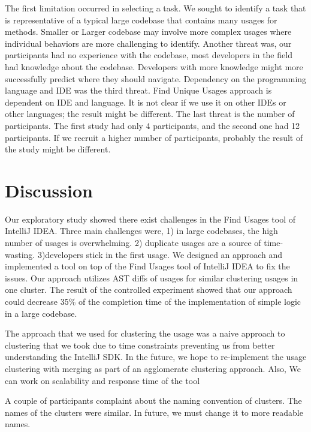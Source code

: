 \documentclass[conference]{IEEEtran}
\begin{document}
The first limitation occurred in selecting a task. We sought to identify a task that is representative of a typical large codebase that contains many usages for methods. Smaller or Larger codebase may involve more complex usages where individual behaviors are more challenging to identify. Another threat was, our participants had no experience with the codebase, most developers in the field had knowledge about the codebase. Developers with more knowledge might more successfully predict where they should navigate. Dependency on the programming language and IDE was the third threat. Find Unique Usages approach is dependent on IDE and language. It is not clear if we use it on other IDEs or other languages; the result might be different. The last threat is the number of participants. The first study had only 4 participants, and the second one had 12 participants. If we recruit a higher number of participants, probably the result of the study might be different.

\section{Discussion}
Our exploratory study showed there exist challenges in the Find Usages tool of IntelliJ IDEA. Three main challenges were, 1) in large codebases, the high number of usages is overwhelming. 2) duplicate usages are a source of time-wasting. 3)developers stick in the first usage. We designed an approach and implemented a tool on top of the Find Usages tool of IntelliJ IDEA to fix the issues. Our approach utilizes AST diffs of usages for similar clustering usages in one cluster. The result of the controlled experiment showed that our approach could decrease 35\% of the completion time of the implementation of simple logic in a large codebase.

The approach that we used for clustering the usage was a naive approach to clustering that we took due to time constraints preventing us from better understanding the IntelliJ SDK. In the future, we hope to re-implement the usage clustering with merging as part of an agglomerate clustering approach. Also, We can work on scalability and response time of the tool \par


A couple of participants complaint about the naming convention of clusters. The names of the clusters were similar. In future, we must change it to more readable names.\par
\end{document}
